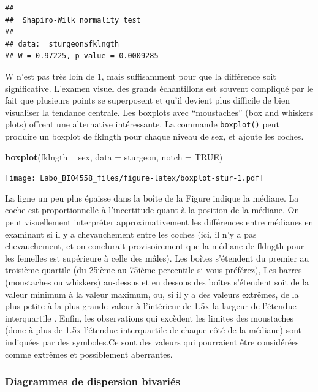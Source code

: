 \documentclass[12pt,]{book}
\newenvironment{Shaded}{\begin{snugshade}}{\end{snugshade}}
\newcommand{\DataTypeTok}[1]{\textcolor[rgb]{0.27,0.27,0.27}{#1}}
\newcommand{\KeywordTok}[1]{\textcolor[rgb]{0.27,0.27,0.27}{\textbf{#1}}}
\newcommand{\NormalTok}[1]{#1}
\newcommand{\OperatorTok}[1]{\textcolor[rgb]{0.43,0.43,0.43}{\textbf{#1}}}
\newcommand{\OtherTok}[1]{\textcolor[rgb]{0.37,0.37,0.37}{#1}}
\newcommand{\StringTok}[1]{\textcolor[rgb]{0.5,0.5,0.5}{#1}}
\begin{document}
\begin{verbatim}
## 
## 	Shapiro-Wilk normality test
## 
## data:  sturgeon$fklngth
## W = 0.97225, p-value = 0.0009285
\end{verbatim}

W n'est pas très loin de 1, mais suffisamment pour que la différence soit significative.
L'examen visuel des grands échantillons est souvent compliqué par le fait que plusieurs points se superposent et qu'il devient plus difficile de bien visualiser la tendance centrale.
Les boxplots avec ``moustaches'' (box and whiskers plots) offrent une alternative intéressante.
La commande \texttt{boxplot()} peut produire un boxplot de fklngth pour chaque niveau de sex, et ajoute les coches.

\begin{Shaded}
\begin{Highlighting}[]
\KeywordTok{boxplot}\NormalTok{(fklngth }\OperatorTok{~}\StringTok{ }\NormalTok{sex, }\DataTypeTok{data =}\NormalTok{ sturgeon, }\DataTypeTok{notch =} \OtherTok{TRUE}\NormalTok{)}
\end{Highlighting}
\end{Shaded}

\texttt{[image: Labo\_BIO4558\_files/figure-latex/boxplot-stur-1.pdf]}

La ligne un peu plus épaisse dans la boîte de la Figure indique la médiane.
La coche est proportionnelle à l'incertitude quant à la position de la médiane.
On peut visuellement interpréter approximativement les différences entre médianes en examinant si il y a chevauchement entre les coches (ici, il n'y a pas chevauchement, et on conclurait provisoirement que la médiane de fklngth pour les femelles est supérieure à celle des mâles).
Les boîtes s'étendent du premier au troisième quartile (du 25ième au 75ième percentile si vous préférez), Les barres (moustaches ou whiskers) au-dessus et en dessous des boîtes s'étendent soit de la valeur minimum à la valeur maximum, ou, si il y a des valeurs extrêmes, de la plus petite à la plus grande valeur à l'intérieur de 1.5x la largeur de l'étendue interquartile .
Enfin, les observations qui excèdent les limites des moustaches (donc à plus de 1.5x l'étendue interquartile de chaque côté de la médiane) sont indiquées par des symboles.Ce sont des valeurs qui pourraient être considérées comme extrêmes et possiblement aberrantes.

\hypertarget{diagrammes-de-dispersion-bivariuxe9s}{%
\subsubsection{Diagrammes de dispersion bivariés}\label{diagrammes-de-dispersion-bivariuxe9s}}
\end{document}

